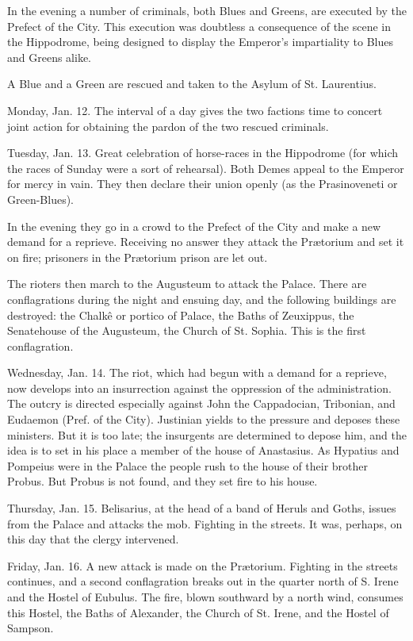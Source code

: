 In the evening a number of criminals, both Blues and Greens, are executed by the Prefect of the City. This execution was doubtless a consequence of the scene in the Hippodrome, being designed to display the Emperor\texthebrew{}’s impartiality to Blues and Greens alike.

A Blue and a Green are rescued and taken to the Asylum of St. Laurentius.

Monday, Jan. 12. The interval of a day gives the two factions time to concert joint action for obtaining the pardon of the two rescued criminals.

Tuesday, Jan. 13. Great celebration of horse-races in the Hippodrome (for which the races of Sunday were a sort of rehearsal). Both Demes appeal to the Emperor for mercy in vain. They then declare their union openly (as the Prasinoveneti or Green-Blues).

In the evening they go in a crowd to the Prefect of the City and make a new demand for a reprieve. Receiving no answer they attack the Prætorium and set it on fire; prisoners in the Prætorium prison are let out.

The rioters then march to the Augusteum to attack the Palace. There are conflagrations during the night and ensuing day, and the following buildings are destroyed: the Chalkê or portico of Palace, the Baths of Zeuxippus, the Senatehouse of the Augusteum, the Church of St. Sophia. This is the first conflagration.

Wednesday, Jan. 14. The riot, which had begun with a demand for a reprieve, now develops into an insurrection against the oppression of the administration. The outcry is directed especially against John the Cappadocian, Tribonian, and Eudaemon (Pref. of the City). Justinian yields to the pressure and deposes these ministers. But it is too late; the insurgents are determined to depose him, and the idea is to set in his place a member of the house of Anastasius. As Hypatius and Pompeius were in the Palace the people rush to the house of their brother Probus. But Probus is not found, and they set fire to his house.

Thursday, Jan. 15. Belisarius, at the head of a band of Heruls and Goths, issues from the Palace and attacks the mob. Fighting in the streets. It was, perhaps, on this day that the clergy intervened.

Friday, Jan. 16. A new attack is made on the Prætorium. Fighting in the streets continues, and a second conflagration breaks out in the quarter north of S. Irene and the Hostel of Eubulus. The fire, blown southward by a north wind, consumes this Hostel, the Baths of Alexander, the Church of St. Irene, and the Hostel of Sampson.

